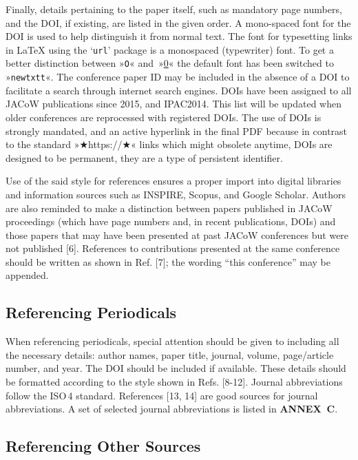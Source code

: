 \documentclass[%
               hyphens,       %
               ]{jacow}
\begin{document}
Finally, details pertaining to the paper itself, such as mandatory page numbers, and the DOI, if existing, are listed in the given order. A mono-spaced font for the DOI is used to help distinguish it from normal text. The font for typesetting links in \LaTeX{} using the ‘\texttt{url}’ package 
is a monospaced (typewriter) font. To get a better distinction between »\texttt{O}« and~»\url{0}« the default font has been switched to »\texttt{newtxtt}«. The conference paper ID may be included in the absence of a DOI to facilitate a search through internet search engines. DOIs have been assigned to all JACoW publications since 2015, and IPAC2014. This list will be updated when older conferences are reprocessed with registered DOIs. The use of DOIs is strongly mandated, and an active hyperlink in the final PDF because in contrast to the standard »★https://★« links which might obsolete anytime, DOIs are designed to be permanent, they are a type of persistent identifier.

Use of the said style for references ensures a proper import into digital libraries and information sources such as INSPIRE, Scopus, and Google Scholar. Authors are also reminded to make a distinction between papers published in JACoW proceedings (which have page numbers and, in recent publications, DOIs) and those papers that may have been presented at past JACoW conferences but were not published [6]. References to contributions presented at the same conference should be written as shown in Ref. [7]; the wording “this conference” may be appended.

\subsection{Referencing Periodicals}

When referencing periodicals, special attention should be given to including all the necessary details: author names, paper title, journal, volume, page/article number, and year. The DOI should be included if available. These details should be formatted according to the style shown in Refs. [8-12]. Journal abbreviations follow the ISO\,4 standard. References [13, 14] are good sources for journal abbreviations. A set of selected journal abbreviations is listed in \textbf{ANNEX~C}.

\subsection{Referencing Other Sources}
\end{document}
